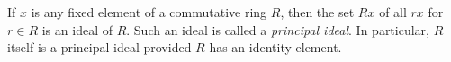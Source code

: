 If $x$ is any fixed element of a commutative ring $R$, then the set $Rx$ of all $rx$ for $r \in R$ is an ideal of $R$. Such an ideal is called a \emph{principal ideal}. In particular, $R$ itself is a principal ideal provided $R$ has an identity element.
